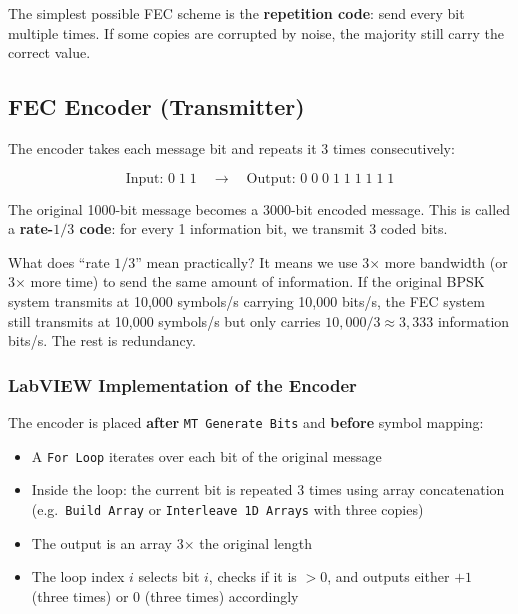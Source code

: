 The simplest possible FEC scheme is the \textbf{repetition code}: send every bit multiple times. If some copies are corrupted by noise, the majority still carry the correct value.

\subsection{FEC Encoder (Transmitter)}

The encoder takes each message bit and repeats it 3 times consecutively:

\begin{equation}
\text{Input: } 0\;1\;1 \quad\longrightarrow\quad \text{Output: } 0\;0\;0\;1\;1\;1\;1\;1\;1
\end{equation}

The original 1000-bit message becomes a 3000-bit encoded message. This is called a \textbf{rate-$1/3$ code}: for every 1 information bit, we transmit 3 coded bits.

\begin{IntuitionBox}{What does ``rate $1/3$'' mean practically?}
It means we use 3$\times$ more bandwidth (or 3$\times$ more time) to send the same amount of information. If the original BPSK system transmits at 10,000 symbols/s carrying 10,000 bits/s, the FEC system still transmits at 10,000 symbols/s but only carries $10{,}000 / 3 \approx 3{,}333$ information bits/s. The rest is redundancy.
\end{IntuitionBox}

\subsubsection{LabVIEW Implementation of the Encoder}

The encoder is placed \textbf{after} \texttt{MT Generate Bits} and \textbf{before} symbol mapping:

\begin{itemize}
\item A \texttt{For Loop} iterates over each bit of the original message
\item Inside the loop: the current bit is repeated 3 times using array concatenation (e.g.\ \texttt{Build Array} or \texttt{Interleave 1D Arrays} with three copies)
\item The output is an array 3$\times$ the original length
\item The loop index $i$ selects bit $i$, checks if it is $> 0$, and outputs either $+1$ (three times) or $0$ (three times) accordingly
\end{itemize}

